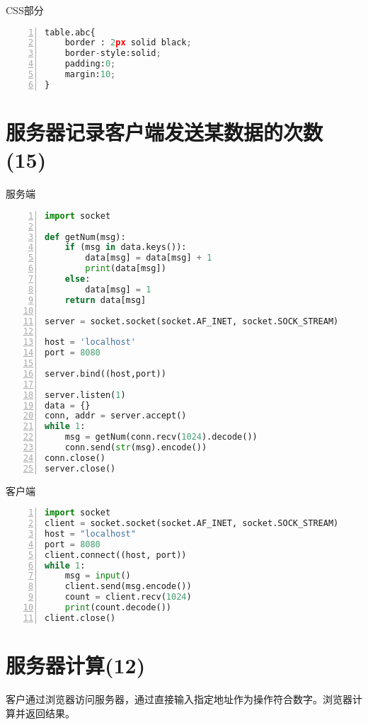 \documentclass[fleqn]{article}
\begin{document}
\noindent CSS部分
\begin{lstlisting}[language = Python, numbers=left, 
    numberstyle=\tiny,keywordstyle=\color{blue!70},
    commentstyle=\color{red!50!green!50!blue!50},frame=shadowbox,
    rulesepcolor=\color{red!20!green!20!blue!20},basicstyle=\ttfamily]
table.abc{
    border : 2px solid black;
    border-style:solid;
    padding:0;
    margin:10;
}
\end{lstlisting}

\section{服务器记录客户端发送某数据的次数(15)}
\noindent 服务端
\begin{lstlisting}[language = Python, numbers=left, 
    numberstyle=\tiny,keywordstyle=\color{blue!70},
    commentstyle=\color{red!50!green!50!blue!50},frame=shadowbox,
    rulesepcolor=\color{red!20!green!20!blue!20},basicstyle=\ttfamily]
import socket

def getNum(msg):
    if (msg in data.keys()):
        data[msg] = data[msg] + 1
        print(data[msg])
    else:
        data[msg] = 1
    return data[msg] 

server = socket.socket(socket.AF_INET, socket.SOCK_STREAM)

host = 'localhost'
port = 8080

server.bind((host,port))

server.listen(1)
data = {}
conn, addr = server.accept()
while 1:
    msg = getNum(conn.recv(1024).decode())
    conn.send(str(msg).encode())
conn.close()
server.close()
\end{lstlisting}

\noindent 客户端
\begin{lstlisting}[language = Python, numbers=left, 
    numberstyle=\tiny,keywordstyle=\color{blue!70},
    commentstyle=\color{red!50!green!50!blue!50},frame=shadowbox,
    rulesepcolor=\color{red!20!green!20!blue!20},basicstyle=\ttfamily]
import socket
client = socket.socket(socket.AF_INET, socket.SOCK_STREAM)
host = "localhost"
port = 8080
client.connect((host, port))
while 1:
    msg = input()
    client.send(msg.encode())
    count = client.recv(1024)
    print(count.decode())
client.close()
\end{lstlisting}

\clearpage
\section{服务器计算(12)}
\noindent 客户通过浏览器访问服务器，通过直接输入指定地址作为操作符合数字。浏览器计算并返回结果。
\end{document}
